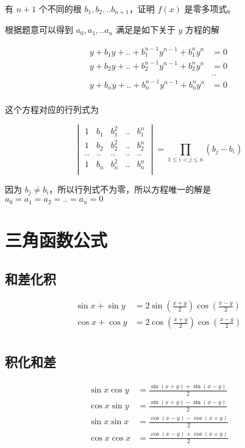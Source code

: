 \documentclass[12pt,a4paper]{ctexart}
\begin{document}
有 $n+1$ 个不同的根 $b_1, b_2, .. b_{n+1}$，证明 $f(x)$ 是零多项式。

根据题意可以得到 $a_0, a_1, .. a_n$ 满足是如下关于 $y$ 方程的解


\begin{align*}
y + b_1y + .. + b_1^{n-1}y^{n-1} + b_1^ny^{n} &= 0 \\
y + b_2y + .. + b_2^{n-1}y^{n-1} + b_2^ny^{n} &= 0 \\
&.. \\
y + b_ny + .. + b_n^{n-1}y^{n-1} + b_n^ny^{n} &= 0 \\
\end{align*}

这个方程对应的行列式为

\[
\begin{vmatrix}
    1 & b_1 & b_1^2 & .. &b_1^n \\
    1 & b_2 & b_2^2 & .. &b_2^n \\
    .. & .. &.. &.. &..  \\
    1 & b_n & b_n^2 & .. &b_n^n \\
\end{vmatrix} = \prod_{1 \le i < j \le n}\left( b_j - b_i\right)
\]

因为 $b_j \ne b_i$，所以行列式不为零，所以方程唯一的解是 $a_0 = a_1 = a_2 = .. = a_n = 0$

\section{三角函数公式}

\subsection{和差化积}

\begin{align*}
    \sin x + \sin y &= 2 \sin(\frac{x+y}{2}) \cos (\frac{x-y}{2}) \\
    \cos x + \cos y &= 2 \cos(\frac{x+y}{2}) \cos (\frac{x-y}{2}) \\
\end{align*}

\subsection{积化和差}

\begin{align*}
   \sin x \cos y &= \frac{\sin(x+y) + \sin(x-y)}{2}  \\
   \cos x \sin y &= \frac{\sin(x+y) - \sin(x-y)}{2}  \\
   \sin x \sin x &= \frac{\cos(x-y) - \cos(x+y)}{2} \\
   \cos x \cos x &= \frac{\cos(x-y) + \cos(x+y)}{2} \\
\end{align*}
\end{document}
